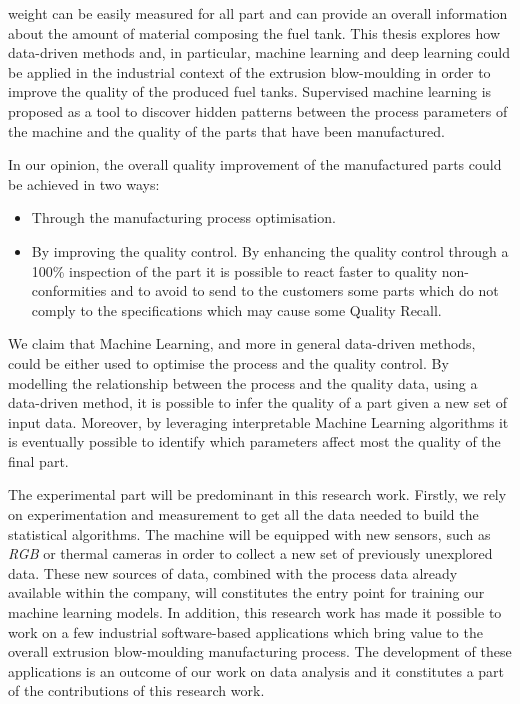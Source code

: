 weight can be easily measured for all part and can provide an overall information about the amount of material composing the fuel tank. This thesis explores how data-driven methods and, in particular, machine learning and deep learning could be applied in the industrial context of the extrusion blow-moulding in order to improve the quality of the produced fuel tanks. Supervised machine learning is proposed as a tool to discover hidden patterns between the process parameters of the machine and the quality of the parts that have been manufactured.

In our opinion, the overall quality improvement of the manufactured parts could be achieved in two ways:

\begin{itemize}
    \item Through the manufacturing process optimisation.   
    \item By improving the quality control. By enhancing the quality control through a 100\% inspection of the part it is possible to react faster to quality non-conformities and to avoid to send to the customers some parts which do not comply to the specifications which may cause some Quality Recall.  
\end{itemize}
%
We claim that Machine Learning, and more in general data-driven methods, could be either used to optimise the process and the quality control. By modelling the relationship between the process and the quality data, using a data-driven method, it is possible to infer the quality of a part given a new set of input data. Moreover, by leveraging interpretable Machine Learning algorithms it is eventually possible to identify which parameters affect most the quality of the final part.    

The experimental part will be predominant in this research work. Firstly, we rely on experimentation and measurement to get all the data needed to build the statistical algorithms. The machine will be equipped with new sensors, such as \textit{RGB} or thermal cameras in order to collect a new set of previously unexplored data. These new sources of data, combined with the process data already available within the company, will constitutes the entry point for training our machine learning models. In addition, this research work has made it possible to work on a few industrial software-based applications which bring value to the overall extrusion blow-moulding manufacturing process. The development of these applications is an outcome of our work on data analysis and it constitutes a part of the contributions of this research work.

